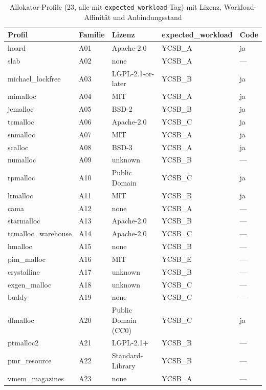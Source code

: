 \begin{table}[!htbp]
  \caption{Allokator-Profile (23, alle mit \texttt{expected\_workload}-Tag) mit Lizenz, Workload-Affinität und Anbindungsstand}\label{tab:allocator-profiles}
  \centering\small
  \begin{tabular}{lllll}
    \toprule
    \textbf{Profil} & \textbf{Familie} & \textbf{Lizenz} & \textbf{expected\_workload} & \textbf{Code} \\
    \midrule
    hoard & A01 & Apache-2.0 & YCSB\_A & ja \\
    slab & A02 & none & YCSB\_A & --- \\
    michael\_lockfree & A03 & LGPL-2.1-or-later & YCSB\_B & ja \\
    mimalloc & A04 & MIT & YCSB\_A & ja \\
    jemalloc & A05 & BSD-2 & YCSB\_B & ja \\
    tcmalloc & A06 & Apache-2.0 & YCSB\_C & ja \\
    snmalloc & A07 & MIT & YCSB\_A & ja \\
    scalloc & A08 & BSD-3 & YCSB\_A & ja \\
    numalloc & A09 & unknown & YCSB\_B & --- \\
    rpmalloc & A10 & Public Domain & YCSB\_C & ja \\
    lrmalloc & A11 & MIT & YCSB\_B & ja \\
    cama & A12 & none & YCSB\_A & --- \\
    starmalloc & A13 & Apache-2.0 & YCSB\_B & --- \\
    tcmalloc\_warehouse & A14 & Apache-2.0 & YCSB\_C & --- \\
    hmalloc & A15 & none & YCSB\_B & --- \\
    pim\_malloc & A16 & MIT & YCSB\_E & --- \\
    crystalline & A17 & unknown & YCSB\_B & --- \\
    exgen\_malloc & A18 & unknown & YCSB\_C & --- \\
    buddy & A19 & none & YCSB\_C & --- \\
    dlmalloc & A20 & Public Domain (CC0) & YCSB\_C & ja \\
    ptmalloc2 & A21 & LGPL-2.1+ & YCSB\_B & --- \\
    pmr\_resource & A22 & Standard-Library & YCSB\_B & --- \\
    vmem\_magazines & A23 & none & YCSB\_A & --- \\
    \bottomrule
  \end{tabular}


\end{table}
